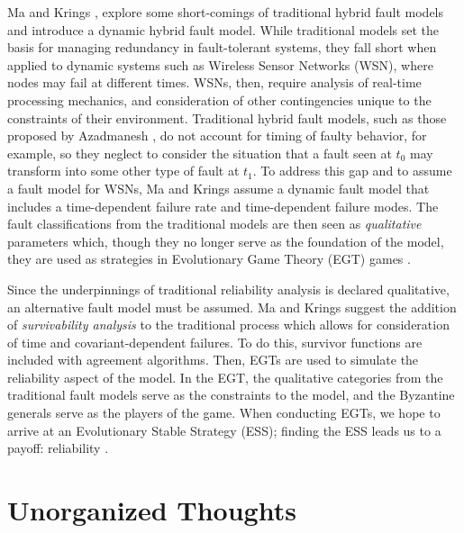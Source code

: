 \documentclass[twoside, conference]{IEEEtran}
\begin{document}
Ma and Krings \cite{Ma2008}, explore some short-comings of traditional hybrid fault models and introduce a dynamic hybrid fault model. While traditional models set the basis for managing redundancy in fault-tolerant systems, they fall short when applied to dynamic systems such as Wireless Sensor Networks (WSN), where nodes may fail at different times. WSNs, then, require analysis of real-time processing mechanics, and consideration of other contingencies unique to the constraints of their environment. Traditional hybrid fault models, such as those proposed by Azadmanesh \cite{Azadmanesh2000}, do not account for timing of faulty behavior, for example, so they neglect to consider the situation that a fault seen at $t_0$ may transform into some other type of fault at $t_1$. To address this gap and to assume a fault model for WSNs, Ma and Krings assume a dynamic fault model that includes a time-dependent failure rate and time-dependent failure modes. The fault classifications from the traditional models are then seen as \textit{qualitative} parameters which, though they no longer serve as the foundation of the model, they are used as strategies in Evolutionary Game Theory (EGT) games \cite{Ma2008}.

Since the underpinnings of traditional reliability analysis is declared qualitative, an alternative fault model must be assumed. Ma and Krings suggest the addition of \textit{survivability analysis} to the traditional process which allows for consideration of time and covariant-dependent failures. To do this, survivor functions are included with agreement algorithms. Then, EGTs are used to simulate the reliability aspect of the model. In the EGT, the qualitative categories from the traditional fault models serve as the constraints to the model, and the Byzantine generals serve as the players of the game. When conducting EGTs, we hope to arrive at an Evolutionary Stable Strategy (ESS); finding the ESS leads us to a payoff: reliability \cite{Ma2008}.

\section{Unorganized Thoughts}
\end{document}
